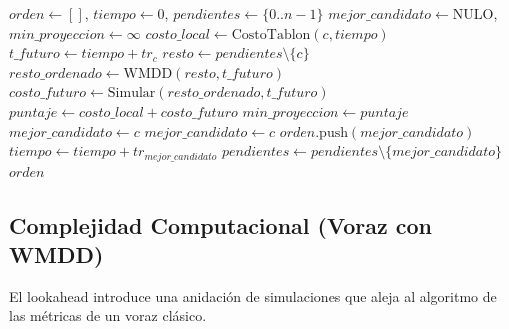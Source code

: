 \documentclass[conference, a4paper]{IEEEtran}
\begin{document}
\begin{algorithm}
\caption{Algoritmo Voraz (Lookahead con WMDD)}
\begin{algorithmic}[1]
\STATE $orden \gets []$, $tiempo \gets 0$, $pendientes \gets \{0..n-1\}$
    \STATE $mejor\_candidato \gets \text{NULO}$, $min\_proyeccion \gets \infty$
        \STATE $costo\_local \gets \text{CostoTablon}(c, tiempo)$
        \STATE $t\_futuro \gets tiempo + tr_c$
        \STATE $resto \gets pendientes \setminus \{c\}$
        \STATE $resto\_ordenado \gets \text{WMDD}(resto, t\_futuro)$
        \STATE $costo\_futuro \gets \text{Simular}(resto\_ordenado, t\_futuro)$
        \STATE $puntaje \gets costo\_local + costo\_futuro$
            \STATE $min\_proyeccion \gets puntaje$
            \STATE $mejor\_candidato \gets c$
            \STATE $mejor\_candidato \gets c$ 
        \ENDIF
    \ENDFOR
    \STATE $orden.\text{push}(mejor\_candidato)$
    \STATE $tiempo \gets tiempo + tr_{mejor\_candidato}$
    \STATE $pendientes \gets pendientes \setminus \{mejor\_candidato\}$
\ENDWHILE
\RETURN $orden$
\end{algorithmic}
\end{algorithm}


\subsection{Complejidad Computacional (Voraz con WMDD)}
El lookahead introduce una anidación de simulaciones que aleja al algoritmo de las métricas de un voraz clásico.
\end{document}

